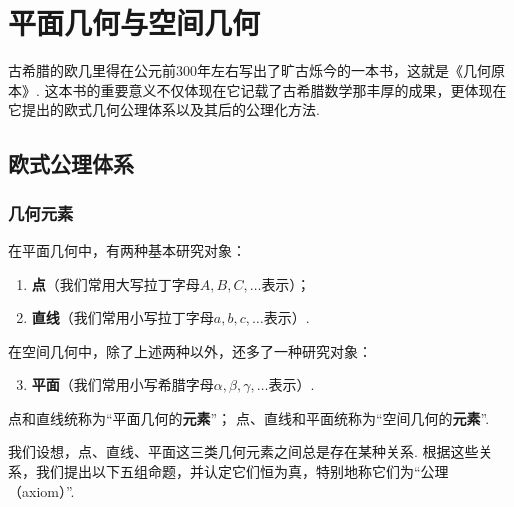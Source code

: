 \chapter{平面几何与空间几何}
古希腊的欧几里得在公元前300年左右写出了旷古烁今的一本书，这就是《几何原本》.
这本书的重要意义不仅体现在它记载了古希腊数学那丰厚的成果，更体现在它提出的欧式几何公理体系以及其后的公理化方法.

\section{欧式公理体系}
\subsection{几何元素}
\begin{definition}\label{definition:欧式几何.几何元素.基本几何元素}
在平面几何中，有两种基本研究对象：
\begin{enumerate}
\item \textbf{点}（我们常用大写拉丁字母\(A,B,C,\dotsc\)表示）；
\item \textbf{直线}（我们常用小写拉丁字母\(a,b,c,\dotsc\)表示）.
\end{enumerate}
在空间几何中，除了上述两种以外，还多了一种研究对象：
\begin{enumerate}
\setcounter{enumi}{2}
\item \textbf{平面}（我们常用小写希腊字母\(\alpha,\beta,\gamma,\dotsc\)表示）.
\end{enumerate}
点和直线统称为“平面几何的\textbf{元素}”；
点、直线和平面统称为“空间几何的\textbf{元素}”.
\end{definition}

我们设想，点、直线、平面这三类几何元素之间总是存在某种关系.
根据这些关系，我们提出以下五组命题，并认定它们恒为真，特别地称它们为“公理（axiom）”.

